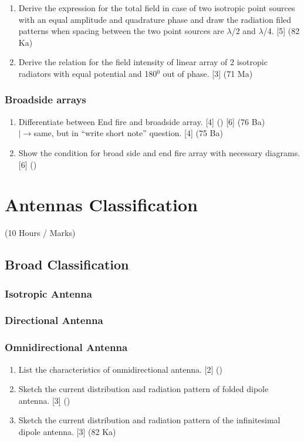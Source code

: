 \documentclass[12pt]{article}
\newcommand{\lb}{\\$\left|\rightarrow\right.$}
\begin{document}
\begin{enumerate}
        \item Derive the expression for the total field in case of two isotropic point sources with an equal amplitude and quadrature phase and draw the radiation filed patterns when spacing between the two point sources are $\lambda$/2 and $\lambda$/4. \hfill [5] (82 Ka)

        \item Derive the relation for the field intensity of linear array of 2 isotropic radiators with equal potential and 180$^0$ out of phase. \hfill [3] (71 Ma)
      \end{enumerate}

    \subsubsection{Broadside arrays}
      \begin{enumerate}
        \item Differentiate between End fire and broadside array. \hfill [4] () [6] (76 Ba)
          \lb same, but in ``write short note'' question. \hfill [4] (75 Ba)

        \item Show the condition for broad side and end fire array with necessary diagrams. \hfill [6] ()
      \end{enumerate}

\pagebreak

\section{Antennas Classification}
  \begin{center} (10 Hours / Marks) \end{center}

  \subsection{Broad Classification}
    \subsubsection{Isotropic Antenna}
    \subsubsection{Directional Antenna}
    \subsubsection{Omnidirectional Antenna}
      \begin{enumerate}
        \item List the characteristics of onmidirectional antenna. \hfill [2] ()

        \item Sketch the current distribution and radiation pattern of folded dipole antenna. \hfill [3] ()

        \item Sketch the current distribution and radiation pattern of the infinitesimal dipole antenna. \hfill [3] (82 Ka)
      \end{enumerate}
    
\end{document}
